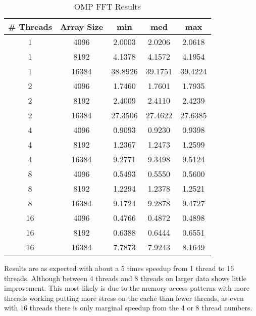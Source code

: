 \documentclass[conference,12pt]{IEEEtran}
\begin{document}
	\begin{table}[ht]
		\caption{OMP FFT Results} 
		\centering  
		\begin{tabular}{c c | c c c} 
		\hline\hline                        
		\# Threads & Array Size & min  & med & max\\ [0.5ex] %
		\hline                 
		1 & 4096 & 2.0003 & 2.0206 & 2.0618  \\ 
		1 & 8192 & 4.1378 & 4.1572 & 4.1954  \\
		1 & 16384 & 38.8926  & 39.1751 &39.4224    \\
		\hline
		2 & 4096 & 1.7460 & 1.7601 & 1.7935  \\ 
		2 & 8192 & 2.4009 &2.4110 & 2.4239  \\
		2 & 16384 & 27.3506  & 27.4622 &27.6385   \\
		\hline
		4 & 4096 & 0.9093 & 0.9230 & 0.9398  \\ 
		4 & 8192 & 1.2367 & 1.2473 & 1.2599  \\
		4 & 16384 & 9.2771  & 9.3498 &9.5124   \\
		\hline
		8 & 4096 & 0.5493 & 0.5550 & 0.5600  \\ 
		8 & 8192 & 1.2294 & 1.2378 & 1.2521  \\
		8 & 16384 & 9.1724  & 9.2878 &9.4727   \\
		\hline
		16 & 4096 & 0.4766 & 0.4872 & 0.4898  \\
		16 & 8192 & 0.6388 & 0.6444 & 0.6551  \\
		16 & 16384 & 7.7873  & 7.9243 &8.1649 \\
		\hline 
		\end{tabular}
		\label{table:ompfft} %
	\end{table}

	Results are as expected with about a 5 times speedup from 1 thread to 16 threads.  Although between 4 threads and 8 threads on larger data shows little improvement.  This most likely is due to the memory access patterns with more threads working putting more stress on the cache than fewer threads, as even with 16 threads there is only marginal speedup from the 4 or 8 thread numbers.
\end{document}
